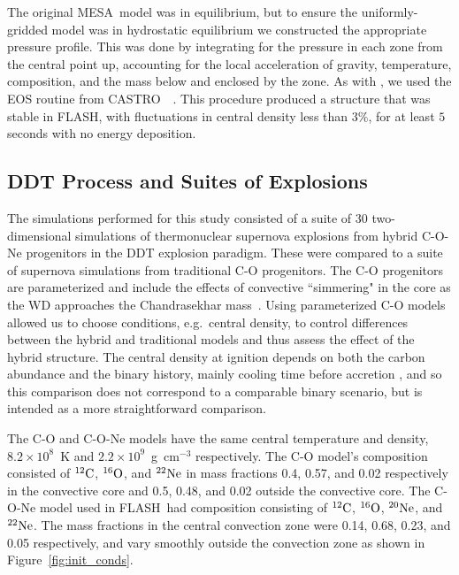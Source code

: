 \documentclass[preprint2]{aastex63}
\newcommand{\C}[1]{\ensuremath{{}^{#1}{\rm C}}}
\newcommand{\Ox}[1]{\ensuremath{{}^{#1}{\rm O}}}
\newcommand{\Ne}[1]{\ensuremath{{}^{#1}{\rm Ne}}}
\newcommand{\code}[1]{\textsc{#1}}
\newcommand{\FLASH}{\code{FLASH}}
\newcommand{\CASTRO}{\code{CASTRO}}
\newcommand{\MESA}{\code{MESA}}
\begin{document}
The original \MESA\ model was in equilibrium, but to ensure
the uniformly-gridded model was in hydrostatic equilibrium we
constructed the appropriate pressure profile. This was done by
integrating for the pressure in each zone from the central point up,
accounting for the local acceleration of gravity, temperature,
composition, and the mass below and enclosed by the zone. As
with \citet{willcoxetal2016}, we used the EOS routine from
\CASTRO\ ~\citep{timmes.swesty:accuracy,castro1}.
This procedure produced a structure that was stable in \FLASH, with 
fluctuations in central density less than $3\%$, for at least $5$ 
seconds with no energy deposition.

\subsection{DDT Process and Suites of Explosions}

The simulations performed for this study consisted of a suite of
30 two-dimensional simulations of thermonuclear supernova explosions 
from hybrid C-O-Ne progenitors in the DDT explosion paradigm. These
were compared to a suite of supernova simulations from traditional C-O 
progenitors. {\color{blue} The C-O progenitors are parameterized and 
include the effects of convective ``simmering" in the core as the WD 
approaches the Chandrasekhar mass~\citep{Chametal08,PiroBild08,jacketal2010}.
Using parameterized C-O models allowed us to choose conditions, e.g.\
central density, to control differences between the hybrid and traditional 
models and thus assess the effect of the hybrid structure.
The central density at ignition depends on both the carbon abundance 
and the binary history, mainly cooling time before accretion 
\citep{Kruegeretal2012}, and so this comparison does not correspond 
to a comparable binary scenario, but is intended as a more 
straightforward comparison.
}

The C-O and C-O-Ne models have the same central temperature
and density, $8.2\times 10^8$~K and $2.2\times 10^9$~g~cm$^{-3}$ respectively.
The C-O model's composition consisted of \C{12}, \Ox{16}, and \Ne{22} in mass fractions 0.4, 0.57, and 0.02 respectively in the convective core and 0.5, 0.48, and 0.02 outside the convective core.
The C-O-Ne model used in \FLASH\ had composition consisting of \C{12}, \Ox{16}, \Ne{20}, and \Ne{22}.
The mass fractions in the central convection zone were 0.14, 0.68, 0.23, and 0.05 respectively, and vary smoothly outside the convection zone as shown in Figure~\ref{fig:init_conds}.
\end{document}
